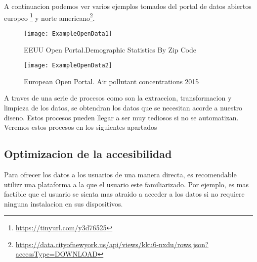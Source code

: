 A continuacion podemos ver varios ejemplos tomados del portal de datos abiertos europeo
\footnote{\url{https://tinyurl.com/y3d76525}} 
y norte americano\footnote{\url{https://data.cityofnewyork.us/api/views/kku6-nxdu/rows.json?accessType=DOWNLOAD}}.

\begin{figure}[h]
    \centering
    \texttt{[image: ExampleOpenData1]}
    \caption{EEUU Open Portal.Demographic Statistics By Zip Code}
    \end{figure}

    \begin{figure}[h]
    \centering
    \texttt{[image: ExampleOpenData2]}
    \caption{European Open Portal. Air pollutant concentrations 2015} 
   
 
\end{figure}

\newpage
    
A traves de una serie de procesos como son  la extraccion, transformacion y 
limpieza de los datos, se obtendran los datos que se necesitan acorde a nuestro diseno. Estos procesos pueden llegar
a ser muy tediosos si no se automatizan.
Veremos estos procesos en los siguientes apartados\\
    

\subsection{Optimizacion de la accesibilidad}

Para ofrecer los datos a los usuarios de una manera directa, es recomendable utilizr una plataforma a la que el usuario
este familiarizado. Por ejemplo, es mas factible que el usuario se sienta mas atraido a acceder a los datos si no requiere
ninguna instalacion en sus dispositivos.

